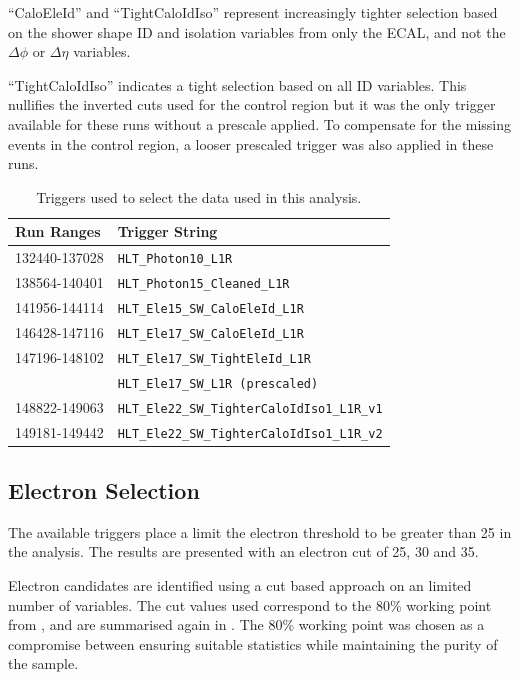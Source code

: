``CaloEleId'' and ``TightCaloIdIso'' represent increasingly tighter selection
based on the shower shape ID and isolation variables from only the \ac{ECAL},
and not the $\Delta\phi$ or $\Delta\eta$ variables.  

``TightCaloIdIso'' indicates a tight selection based on all ID variables. 
This nullifies the inverted cuts used for the control region but
it was the only trigger available for these runs without a prescale applied.
To compensate for the missing events in the control region, a looser prescaled
trigger was also applied in these runs.

\begin{table}[htbp]
  \centering
  \begin{tabular}{ l l }
    \toprule
    Run Ranges & Trigger String\\
    \midrule
    132440-137028 & \verb=HLT_Photon10_L1R= \\
    138564-140401 & \verb=HLT_Photon15_Cleaned_L1R= \\
    141956-144114 & \verb=HLT_Ele15_SW_CaloEleId_L1R= \\
    146428-147116 & \verb=HLT_Ele17_SW_CaloEleId_L1R= \\
    147196-148102 & \verb=HLT_Ele17_SW_TightEleId_L1R= \\
                  & \verb=HLT_Ele17_SW_L1R (prescaled)= \\ 
    148822-149063 & \verb=HLT_Ele22_SW_TighterCaloIdIso1_L1R_v1= \\
    149181-149442 & \verb=HLT_Ele22_SW_TighterCaloIdIso1_L1R_v2= \\
    \bottomrule
  \end{tabular}
  \caption{Triggers used to select the data used in this analysis.}
  \label{tab:triggers}
\end{table}

\subsection{Electron Selection}
The available triggers place a limit the electron \pT threshold to be
greater than \unit{25}{\GeV} in the analysis. 
The results are presented with an electron \pT cut of 25, 30
and \unit{35}{\GeV}.

Electron candidates are identified using a cut based approach on an limited
number of variables. The cut values used correspond to the \unit{80}{\%}
working point from , and are summarised again in
. The \unit{80}{\%} working point was chosen as a
compromise between ensuring suitable statistics while maintaining the purity of
the sample.

